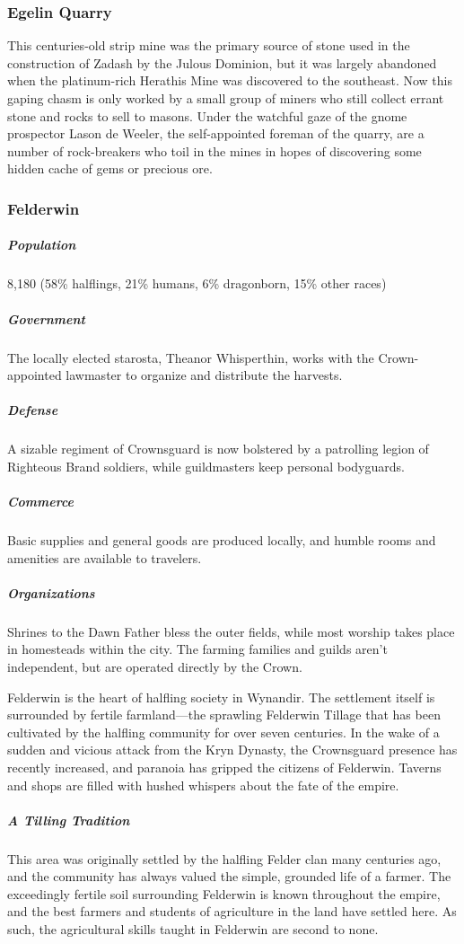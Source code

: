 \documentclass[10pt,a4paper,twoside,bg=print,twocolumn,openany,nodeprecatedcode]{dndbook}
\begin{document}
\subsubsection{Egelin Quarry}
This centuries-old strip mine was the primary source of stone used in the construction of Zadash by the Julous Dominion, but it was largely abandoned when the platinum-rich Herathis Mine was discovered to the southeast. Now this gaping chasm is only worked by a small group of miners who still collect errant stone and rocks to sell to masons. Under the watchful gaze of the gnome prospector Lason de Weeler, the self-appointed foreman of the quarry, are a number of rock-breakers who toil in the mines in hopes of discovering some hidden cache of gems or precious ore.

\subsubsection{Felderwin}
\subparagraph{Population}
8,180 (58\% halflings, 21\% humans, 6\% dragonborn, 15\% other races)

\subparagraph{Government}
The locally elected starosta, Theanor Whisperthin, works with the Crown-appointed lawmaster to organize and distribute the harvests.

\subparagraph{Defense}
A sizable regiment of Crownsguard is now bolstered by a patrolling legion of Righteous Brand soldiers, while guildmasters keep personal bodyguards.

\subparagraph{Commerce}
Basic supplies and general goods are produced locally, and humble rooms and amenities are available to travelers.

\subparagraph{Organizations}
Shrines to the Dawn Father bless the outer fields, while most worship takes place in homesteads within the city. The farming families and guilds aren't independent, but are operated directly by the Crown.

Felderwin is the heart of halfling society in Wynandir. The settlement itself is surrounded by fertile farmland—the sprawling Felderwin Tillage that has been cultivated by the halfling community for over seven centuries. In the wake of a sudden and vicious attack from the Kryn Dynasty, the Crownsguard presence has recently increased, and paranoia has gripped the citizens of Felderwin. Taverns and shops are filled with hushed whispers about the fate of the empire.

\subparagraph{A Tilling Tradition}
This area was originally settled by the halfling Felder clan many centuries ago, and the community has always valued the simple, grounded life of a farmer. The exceedingly fertile soil surrounding Felderwin is known throughout the empire, and the best farmers and students of agriculture in the land have settled here. As such, the agricultural skills taught in Felderwin are second to none.
\end{document}
